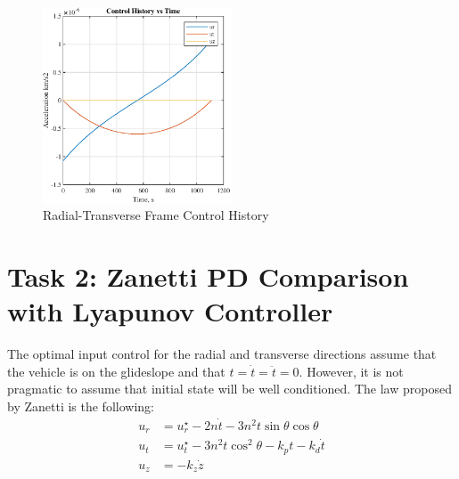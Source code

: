 \documentclass[conf]{new-aiaa}
\begin{document}
\begin{singlespace}
\begin{figure}[!htbp] 
  \centering
  \includegraphics[width=0.5\textwidth]{figures/controls.eps}
  \caption{Radial-Transverse Frame Control History}
  \label{fig:v2}
 \end{figure}


\clearpage
\section{Task 2: Zanetti PD Comparison with Lyapunov Controller}
The optimal input control for the radial and transverse directions assume that the vehicle is on the glideslope and that $t = \dot{t} = \ddot{t} = 0$. However, it is not pragmatic to assume that initial state will be well conditioned. The law proposed by Zanetti is the following:
%
\begin{align}
    u_r &= u_r^\star - 2n\dot{t} - 3n^2t\sin\theta\cos\theta \\
    u_t &= u_t^\star - 3n^2t\cos^2\theta - k_pt -k_d\dot{t} \\
    u_z &= -k_z\dot{z}
\end{align}
%

\end{singlespace}
\end{document}
